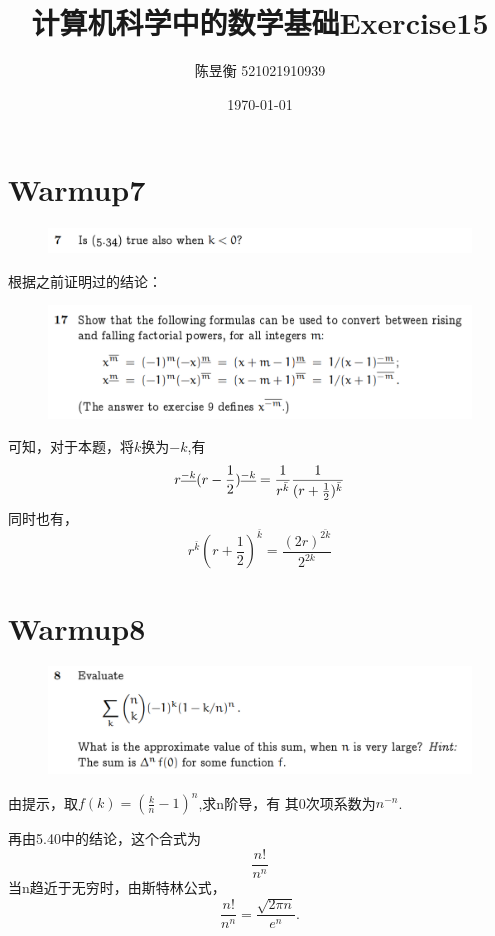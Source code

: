 \documentclass[]{article}
\title{计算机科学中的数学基础Exercise15}
\author{陈昱衡 521021910939}
\date{\today}
\begin{document}
\maketitle


\section*{Warmup7}
\begin{figure}[H]
    \includegraphics[scale = 0.6]{2023-04-03-17-14-54.png}
\end{figure}
根据之前证明过的结论：
\begin{figure}[H]
    \centering
    \includegraphics[scale = 0.3]{2023-04-03-23-37-43.png}
\end{figure}
可知，对于本题，将$k$换为$-k$,有
\begin{equation}
    r^{\underline{-k}}(r-\frac{1}{2})^{\underline{-k}} = \frac{1}{r^{\bar{k}}}\frac{1}{(r+\frac{1}{2})^{\bar{k}}}\\
\end{equation}
同时也有，\begin{equation}
    r^{\bar{k}}(r+\frac{1}{2})^{\bar{k}} = \frac{(2r)^{\bar{2k}}}{2^{2k}}
\end{equation}


\section*{Warmup8}
\begin{figure}[H]
    \includegraphics[scale = 0.6]{2023-04-03-17-16-17.png}
\end{figure}
由提示，取$f(k) = (\frac{k}{n} - 1)^{n}$,求n阶导，有
其0次项系数为$n^{-n}$.\par 
再由5.40中的结论，这个合式为
\begin{equation}
    \frac{n!}{n^n}
\end{equation}
当n趋近于无穷时，由斯特林公式，
\begin{equation}
    \frac{n!}{n^n} = \frac{\sqrt{2\pi n}}{e^n}.
\end{equation}
\end{document}
